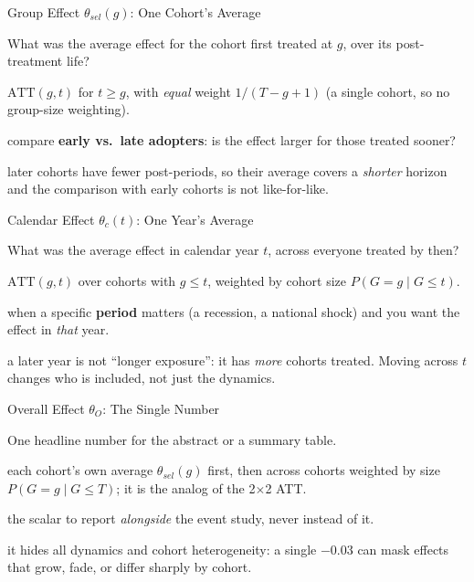 \documentclass[main.tex]{subfiles}
\begin{document}
\begin{frame}{Group Effect $\theta_{sel}(g)$: One Cohort's Average}

  \begin{description}[Averages]
    \item[Question] What was the average effect for the cohort first treated at $g$,
      over its post-treatment life?
    \item[Averages] $\text{ATT}(g,t)$ for $t \ge g$, with \emph{equal} weight
      $1/(T{-}g{+}1)$ (a single cohort, so no group-size weighting).
    \item[Use it] compare \textbf{early vs.\ late adopters}: is the effect larger
      for those treated sooner?
    \item[\color{AlertRed}Caveat] later cohorts have fewer post-periods, so their
      average covers a \emph{shorter} horizon and the comparison with early
      cohorts is not like-for-like.
  \end{description}

\end{frame}

\begin{frame}{Calendar Effect $\theta_c(t)$: One Year's Average}

  \begin{description}[Averages]
    \item[Question] What was the average effect in calendar year $t$, across
      everyone treated by then?
    \item[Averages] $\text{ATT}(g,t)$ over cohorts with $g \le t$, weighted by
      cohort size $P(G{=}g \mid G \le t)$.
    \item[Use it] when a specific \textbf{period} matters (a recession, a
      national shock) and you want the effect in \emph{that} year.
    \item[\color{AlertRed}Caveat] a later year is not ``longer exposure'': it has
      \emph{more} cohorts treated. Moving across $t$ changes who is included, not
      just the dynamics.
  \end{description}

\end{frame}

\begin{frame}{Overall Effect $\theta_O$: The Single Number}

  \begin{description}[Averages]
    \item[Question] One headline number for the abstract or a summary table.
    \item[Averages] each cohort's own average $\theta_{sel}(g)$ first, then across
      cohorts weighted by size $P(G{=}g \mid G \le T)$; it is the analog of the 2$\times$2 ATT.
    \item[Use it] the scalar to report \emph{alongside} the event study, never
      instead of it.
    \item[\color{AlertRed}Caveat] it hides all dynamics and cohort heterogeneity:
      a single $-0.03$ can mask effects that grow, fade, or differ sharply by cohort.
  \end{description}

\end{frame}
\end{document}
